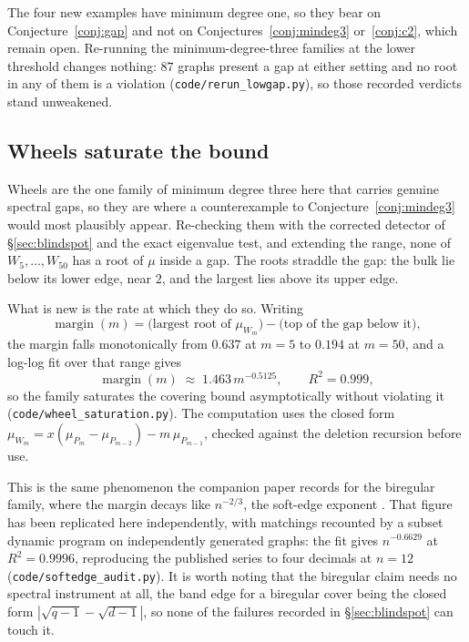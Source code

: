 \documentclass[11pt]{article}
\theoremstyle{remark}
\begin{document}
The four new examples have minimum degree one, so they bear on Conjecture~\ref{conj:gap} and not on
Conjectures~\ref{conj:mindeg3} or~\ref{conj:c2}, which remain open. Re-running the
minimum-degree-three families at the lower threshold changes nothing: $87$ graphs present a gap at
either setting and no root in any of them is a violation (\texttt{code/rerun\_lowgap.py}), so those
recorded verdicts stand unweakened.

\subsection{Wheels saturate the bound}\label{sec:wheels}

Wheels are the one family of minimum degree three here that carries genuine spectral gaps, so they
are where a counterexample to Conjecture~\ref{conj:mindeg3} would most plausibly appear. Re-checking
them with the corrected detector of \S\ref{sec:blindspot} and the exact eigenvalue test, and
extending the range, none of $W_5,\dots,W_{50}$ has a root of $\mu$ inside a gap. The roots straddle
the gap: the bulk lie below its lower edge, near $2$, and the largest lies above its upper edge.

What is new is the rate at which they do so. Writing
\[
  \operatorname{margin}(m)=\bigl(\text{largest root of }\mu_{W_m}\bigr)-\bigl(\text{top of the gap
  below it}\bigr),
\]
the margin falls monotonically from $0.637$ at $m=5$ to $0.194$ at $m=50$, and a log-log fit over
that range gives
\[
  \operatorname{margin}(m)\;\approx\;1.463\,m^{-0.5125},\qquad R^2=0.999,
\]
so the family saturates the covering bound asymptotically without violating it
(\texttt{code/wheel\_saturation.py}). The computation uses the closed form
$\mu_{W_m}=x(\mu_{P_m}-\mu_{P_{m-2}})-m\,\mu_{P_{m-1}}$, checked against the deletion recursion
before use.

This is the same phenomenon the companion paper records for the biregular family, where the margin
decays like $n^{-2/3}$, the soft-edge exponent \cite{PartII}. That figure has been replicated here
independently, with matchings recounted by a subset dynamic program on independently generated
graphs: the fit gives $n^{-0.6629}$ at $R^2=0.9996$, reproducing the published series to four
decimals at $n=12$ (\texttt{code/softedge\_audit.py}). It is worth noting that the biregular claim
needs no spectral instrument at all, the band edge for a biregular cover being the closed form
$|\sqrt{q-1}-\sqrt{d-1}|$, so none of the failures recorded in \S\ref{sec:blindspot} can touch it.
\end{document}
